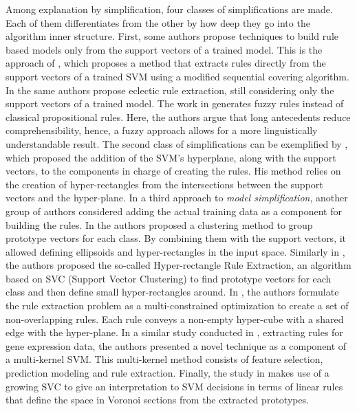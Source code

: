 \documentclass[final]{elsarticle}
\begin{document}
Among explanation by simplification, four classes of simplifications are made. Each of them differentiates from the other by how deep they go into the algorithm inner structure. First, some authors propose techniques to build rule based models only from the support vectors of a trained model. This is the approach of \cite{barakat2007rule}, which proposes a method that extracts rules directly from the support vectors of a trained SVM using a modified sequential covering algorithm. In \cite{barakat2008} the same authors propose eclectic rule extraction, still considering only the support vectors of a trained model. The work in \cite{Chaves2005} generates fuzzy rules instead of classical propositional rules. Here, the authors argue that long antecedents reduce comprehensibility, hence, a fuzzy approach allows for a more linguistically understandable result. The second class of simplifications can be exemplified by \cite{fu2004}, which proposed the addition of the SVM's hyperplane, along with the support vectors, to the components in charge of creating the rules. His method relies on the creation of hyper-rectangles from the intersections between the support vectors and the hyper-plane. In a third approach to \textit{model simplification}, another group of authors considered adding the actual training data as a component for building the rules. In \cite{nunez2002rule,nunez2006,nunez2002B} the authors proposed a clustering method to group prototype vectors for each class. By combining them with the support vectors, it allowed defining ellipsoids and hyper-rectangles in the input space. Similarly in \cite{zhang2005}, the authors proposed the so-called Hyper-rectangle Rule Extraction, an algorithm based on SVC (Support Vector Clustering) to find prototype vectors for each class and then define small hyper-rectangles around. In \cite{fung2005}, the authors formulate the rule extraction problem as a multi-constrained optimization to create a set of non-overlapping rules. Each rule conveys a non-empty hyper-cube with a shared edge with the hyper-plane. In a similar study conducted in \cite{chen2007}, extracting rules for gene expression data, the authors presented a novel technique as a component of a multi-kernel SVM. This multi-kernel method consists of feature selection, prediction modeling and rule extraction. Finally, the study in \cite{intepretationSVM} makes use of a growing SVC to give an interpretation to SVM decisions in terms of linear rules that define the space in Voronoi sections from the extracted prototypes.
\end{document}
